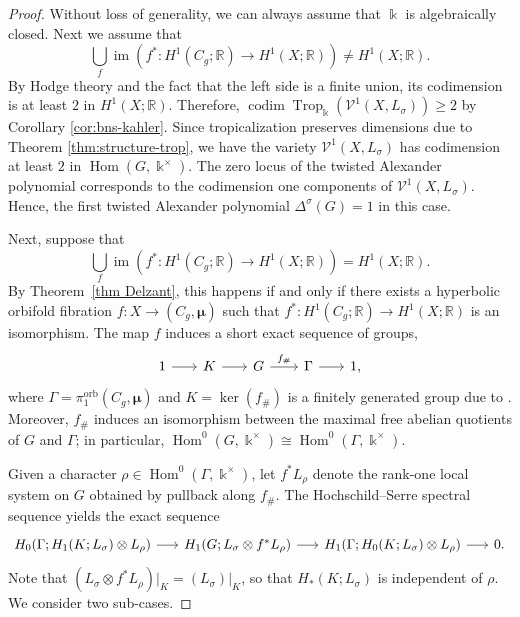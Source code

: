 \documentclass[11pt]{amsart}
\theoremstyle{definition}
\newcommand{\R}{\mathbb{R}}
\renewcommand{\k}{\Bbbk}
\newcommand{\VV}{\mathcal{V}}
\DeclareMathOperator{\im}{im}
\DeclareMathOperator{\codim}{codim}
\DeclareMathOperator{\Hom}{{Hom}}
\DeclareMathOperator{\Trop}{Trop}
\DeclareMathOperator{\orb}{orb}
\begin{document}
\begin{proof}
Without loss of generality, we can always assume that $\k$ is
algebraically closed. Next we assume that 
\[
\bigcup_f 
\im(f^{*}\colon H^1(C_g;\R)\longrightarrow H^1(X;\R)) \neq H^1(X;\R).
\]
By Hodge theory and the fact that the left side is a finite union, 
its codimension is at least $2$ in $H^1(X;\R)$. 
Therefore, $\codim \Trop_\k( \VV^1(X,L_\sigma)) \geq 2$ by Corollary \ref{cor:bns-kahler}. 
Since tropicalization preserves dimensions due to 
Theorem \ref{thm:structure-trop}, we have the variety $\VV^1(X,L_\sigma)$ 
has codimension at least $2$ in $\Hom(G,\k^\times)$. 
The zero locus of 
the twisted Alexander polynomial corresponds to the codimension one 
components of $\VV^1(X,L_\sigma)$. Hence, the first twisted Alexander 
polynomial $\Delta^\sigma(G)=1$ in this case.

Next, suppose that 
\[
\bigcup_f 
\im(f^{*}\colon H^1(C_g;\R)\longrightarrow  H^1(X;\R)) = H^1(X;\R).
\]
By Theorem~\ref{thm Delzant}, this happens if and only if 
there exists a hyperbolic orbifold fibration $f\colon X \to (C_g, \bm{\mu})$ 
such that $f^{*}\colon H^1(C_g;\R)\to H^1(X;\R)$ is an isomorphism. 
The map $f$ induces a short exact sequence of groups, 
\[
\begin{tikzcd}[column sep=18pt]
1\ar[r]& K \ar[r]&  G \ar[r, "f_{\#}"]&[2pt]  \Gamma
\ar[r]& 1,
\end{tikzcd}
\]
where $\Gamma=\pi_1^{\orb}(C_g, \bm{\mu})$ and $K=\ker(f_{\#})$ 
is a finitely generated group due to \cite[Lem.~3]{CKO}. 
Moreover, $f_{\#}$ induces an isomorphism between the maximal 
free abelian quotients of $G$ and $\Gamma$; in particular, 
$\Hom^0(G,\k^{\times}) \cong \Hom^0(\Gamma,\k^{\times})$.

Given a character $\rho \in \Hom^0(\Gamma,\k^{\times})$, 
let $f^* L_{\rho}$ denote the rank-one local system on $G$ 
obtained by pullback along $f_{\#}$. 
The Hochschild--Serre spectral sequence yields the exact sequence
\begin{equation}
\label{eq:hs-ses}
\begin{tikzcd}[column sep=16pt]
H_0(\Gamma; H_1(K;L_\sigma)\otimes L_\rho) \ar[r]
& H_1(G; L_\sigma\otimes f^*L_{\rho}) \ar[r]
& H_1(\Gamma; H_0(K;L_\sigma)\otimes L_\rho) \ar[r]& 0.
\end{tikzcd}
\end{equation}
Note that $(L_\sigma\otimes f^* L_{\rho})\vert_K = (L_\sigma)\vert_K$, 
so that $H_*(K; L_\sigma)$ is independent of $\rho$. We consider 
two sub-cases.


\end{proof}
\end{document}
